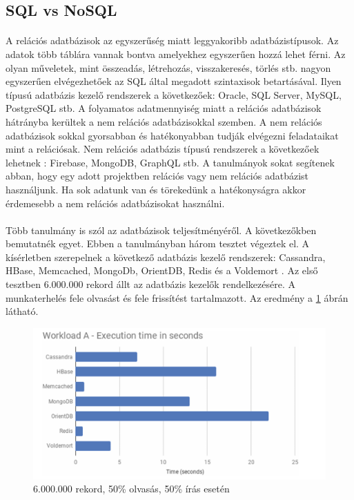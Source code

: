 \subsection{SQL vs NoSQL}
\paragraph{}
A relációs adatbázisok az egyszerűség miatt leggyakoribb adatbázistípusok. Az adatok több táblára vannak bontva amelyekhez egyszerűen hozzá lehet férni. Az olyan műveletek, mint összeadás, létrehozás, visszakeresés, törlés stb. nagyon egyszerűen elvégezhetőek az SQL által megadott szintaxisok betartásával. Ilyen típusú adatbázis kezelő rendszerek a következőek: Oracle, SQL Server, MySQL, PostgreSQL stb. A folyamatos adatmennyiség miatt a relációs adatbázisok hátrányba kerültek a nem relációs adatbázisokkal szemben. A nem relációs adatbázisok sokkal gyorsabban és hatékonyabban tudják elvégezni feladataikat mint a relációsak. Nem relációs adatbázis típusú rendszerek a következőek lehetnek \cite{gupta2017nosql}: Firebase, MongoDB, GraphQL stb. A tanulmányok sokat segítenek abban, hogy egy adott projektben relációs vagy nem relációs adatbázist használjunk. Ha sok adatunk van és törekedünk a hatékonyságra akkor érdemesebb a nem relációs adatbázisokat használni. 
\paragraph{}
Több tanulmány is szól az adatbázisok teljesítményéről. A következőkben bemutatnék egyet. Ebben a tanulmányban három tesztet végeztek el. A kísérletben szerepelnek a következő adatbázis kezelő rendszerek: Cassandra, HBase, Memcached, MongoDb, OrientDB, Redis és a Voldemort \cite{martins2019study}. Az első tesztben 6.000.000 rekord állt az adatbázis kezelők rendelkezésére. A munkaterhelés fele olvasást és fele frissítést tartalmazott. Az eredmény a \ref{fig:performance_a} ábrán látható.
	
\begin{figure}
	\centering
	\includegraphics[scale=0.9]{figures/images/performance_a.png}
	\caption{6.000.000 rekord, 50\% olvasás, 50\% írás esetén \cite{martins2019study}}
	\label{fig:performance_a}
\end{figure}

